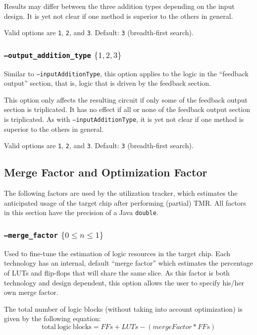 Results may differ between the three addition types depending on the input 
design. It is yet not clear if one method is superior to the others in general. 

Valid options are \texttt{1}, \texttt{2}, and \texttt{3}. Default: \texttt{3} 
(breadth-first search).

\subsubsection{\texttt{--output\_addition\_type} $\{1,2,3\}$}
Similar to \texttt{--inputAdditionType}, this option applies to the logic 
in the ``feedback output'' section, that is, logic that is driven by the
feedback section.

This option only affects the resulting circuit if only some of the feedback 
output section is triplicated. It has no effect if all or none of the feedback 
output section is triplicated. As with \texttt{--inputAdditionType}, it is yet
not clear if one method is superior to the others in general.

Valid options are \texttt{1}, \texttt{2}, and \texttt{3}. Default: \texttt{3} 
(breadth-first search).

\subsection{Merge Factor and Optimization Factor}
The following factors are used by the utilization tracker, which estimates the 
anticipated usage of the target chip after performing (partial) TMR\@. All factors
in this section have the precision of a Java \texttt{double}. 

\subsubsection{\texttt{--merge\_factor} $\{ 0 \leq n \leq 1 \}$ }
Used to fine-tune the estimation of logic resources in the target chip. Each 
technology has an internal, default ``merge factor'' which estimates the 
percentage of LUTs and flip-flops that will share the same slice. As this 
factor is both technology and design dependent, this option allows the user to 
specify his/her own merge factor. 

The total number of logic blocks (without taking into account optimization) is 
given by the following equation:
\begin{equation*}
\mathrm{total~logic~blocks} = FFs + LUTs - (mergeFactor * FFs)
\end{equation*}

